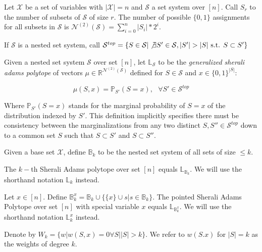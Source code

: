 Let $\mathcal{X}$ be a set of variables with $|\mathcal{X}| = n$ and $\mathcal{S}$ a set system over $[n]$. Call $S_r$ to the number of subsets of $\mathcal{S}$ of size $r$. The number of possible $\{0,1\}$ assignments for all subsets in $\mathcal{S}$ is $\mathcal{N}^{(2)}(\mathcal{S}) = \sum_{i =0}^n |S_i|*2^i$. 

If $\mathcal{S}$ is a nested set system, call $\mathcal{S}^{top} = \{ S \in \mathcal{S} | \not\exists S'\in \mathcal{S}, |S'
| > |S| \text{ s.t. } S \subset S'\}$
\newline


\begin{definition}
Given a nested set system $\mathcal{S}$ over set $[n]$, let $\mathbb{L}_{\mathcal{S}}$ to be the \emph{generalized sherali adams polytope} of vectors $\mu \in \mathbb{R}^{\mathcal{N}^{(2)}(\mathcal{S})}$ defined for $S \in \mathcal{S}$ and $x \in \{0,1\}^{|S|}$:


\begin{equation}\label{objective}
\mu(S, x)  = \mathbb{P}_{S'}(S = x ), \text{  }  \forall S' \in \mathcal{S}^{top}             
\end{equation}

Where $\mathbb{P}_{S'}(S = x )$ stands for the marginal probability of $S = x$ of the distribution indexed by $S'$. This definition implicitly specifies there must be consistency between the marginalizations from any two distinct $S, S'' \in \mathcal{S}^{top}$ down to a common set $S$ such that $S \subset S'$ and $S \subset S''$. 
\end{definition}

Given a base set $\mathcal{X}$, define $\mathbb{B}_k$ to be the nested set system of all sets of size $\leq k$. 
\newline

\begin{definition}
The $k-$th Sherali Adams polytope over set $[n]$ equals $\mathbb{L}_{\mathbb{B}_k}$. We will use the shorthand notation $\mathbb{L}_k$ instead. 
\end{definition}

\begin{definition}
Let $x \in [n]$. Define $\mathbb{B}_k^x = \mathbb{B}_k \cup \{ \{x\} \cup s | s \in \mathbb{B}_k \}$. The pointed Sherali Adams Polytope over set $[n]$ with special variable $x$ equals $\mathbb{L}_{\mathbb{B}_k^x}$. We will use the shorthand notation $\mathbb{L}_k^x$ instead.  
\end{definition}

Denote by $W_k = \{w |  w(S, x) = 0 \forall S | |S| > k\}$. We refer to $w(S.x)$ for $|S| = k$ as the weights of degree $k$. 

